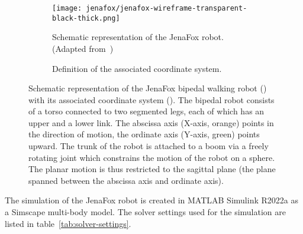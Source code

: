     \begin{figure}[htb]%
        \centering%
        \begin{subfigure}{0.5\linewidth}%
            \centering%
            \texttt{[image: jenafox/jenafox-wireframe-transparent-black-thick.png]}
            \caption{Schematic representation of the JenaFox robot. (Adapted from~\cite{Jenafox:Wireframe})}%
            \label{fig:jenafox-wireframe}%
        \end{subfigure}%
        \hfil%
        \begin{subfigure}{0.5\linewidth}%
            \centering%
            \caption{Deﬁnition of the associated coordinate system.\newline}%
            \label{fig:coordinate-system}%
        \end{subfigure}%
        \caption{Schematic representation of the JenaFox bipedal walking robot () with its associated coordinate system (). The bipedal robot consists of a torso connected to two segmented legs, each of which has an upper and a lower link. The abscissa axis (X-axis, orange) points in the direction of motion, the ordinate axis (Y-axis, green) points upward. The trunk of the robot is attached to a boom via a freely rotating joint which constrains the motion of the robot on a sphere. The planar motion is thus restricted to the sagittal plane (\ie the plane spanned between the abscissa axis and ordinate axis).}%
        \label{fig:jenafox}%
    \end{figure}
    The simulation of the JenaFox robot is created in MATLAB\textsuperscript{\textregistered} Simulink R2022a as a Simscape multi-body model. The solver settings used for the simulation are listed in table~\ref{tab:solver-settings}.


